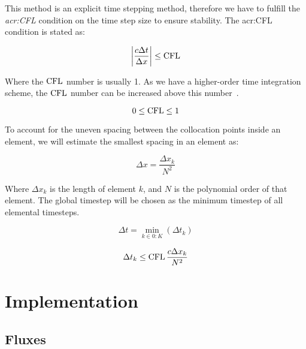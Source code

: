 This method is an explicit time stepping method, therefore we have to fulfill the
\textit{\acrfull{acr:CFL}} condition on the time step size to ensure stability. The
\acrshort{acr:CFL} condition is stated as:

\begin{equation}
	\left| \frac{c \Delta t}{\Delta x} \right| \leq \operatorname{CFL}
\end{equation}

Where the $\operatorname{CFL}$ number is usually 1. As we have a higher-order time integration scheme, the $\operatorname{CFL}$
number can be increased above this number~\cite{Gottlieb2001}. %

\begin{equation}
        0 \leq \operatorname{CFL} \leq 1
\end{equation}

To account for the uneven spacing between the collocation points inside an element, we will estimate
the smallest spacing in an element as: 

\begin{equation}
    \Delta x = \frac{\Delta x_k}{N^2}
\end{equation}

Where $\Delta x_k$ is the length of element $k$, and $N$ is the polynomial order of that element.
The global timestep will be chosen as the minimum timestep of all elemental timesteps. 

\begin{equation}
    \Delta t = \min_{k \in 0:K} \left( \Delta t_k \right)
\end{equation}

\begin{equation}
    \Delta t_k \leq \operatorname{CFL} \frac{c \Delta x_k}{N^2}
\end{equation}

\section{Implementation} \label{section:spectral_element_method:implementation}

\subsection{Fluxes} \label{subsection:spectral_element_method:implementation:fluxes}

